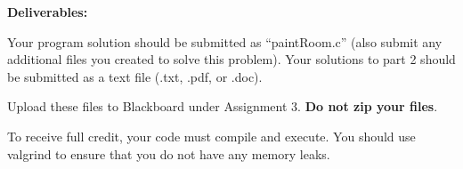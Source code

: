 \documentclass[12pt]{elsart}
\begin{document}
{\bf Deliverables:}

Your program solution should be submitted as ``paintRoom.c'' (also submit any additional files you created to solve this problem).  Your solutions to part 2 should be submitted as a text file (.txt, .pdf, or .doc).

Upload these files to Blackboard under Assignment 3.  {\bf Do not zip your files}. 

To receive full credit, your code must compile and execute. You should use valgrind to ensure that you do not have any memory leaks.

\vfill
\end{document}
